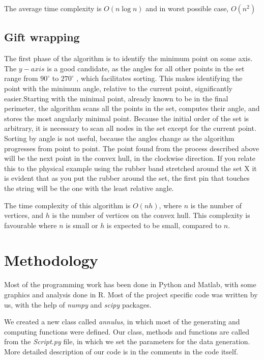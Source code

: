 \documentclass[12pt,a4paper]{article}
\begin{document}
The average time complexity is $O(n\log{n})$ and in worst possible case, $O(n^2)$

\subsection{Gift wrapping}

The first phase of the algorithm is to identify the minimum point on some axis. The $ y-axis $ is a good candidate, as the angles for all other points in the set range from $90^{\circ}$  to $270^ {\circ}$ , which facilitates sorting. This makes identifying the point with the minimum angle, relative to the current point, significantly easier.Starting with the minimal point, already known to be in the final perimeter, the algorithm scans all the points in the set, computes their angle, and stores the most angularly minimal point. Because the initial order of the set is arbitrary, it is necessary to scan all nodes in the set except for the current point. Sorting by angle is not useful, because the angles change as the algorithm progresses from point to point. The point found from the process described above will be the next point in the convex hull, in the clockwise direction. If you relate this to the physical example using the rubber band stretched around the set X it is evident that as you put the rubber around the set, the first pin that touches the string will be the one with the least relative angle.\medskip

The time complexity of this algorithm is $O(nh)$, where $n$ is the number of vertices, and $h$ is the number of vertices on the convex hull. This complexity is favourable where $n$ is small or $h$ is expected to be small, compared to $n$. \medskip

\section{Methodology}
Most of the programming work has been done in Python and Matlab, with some graphics and analysis done in R. Most of the project specific code was written by us, with the help of \textit{numpy} and \textit{scipy} packages.
\medskip

We created a new class called \textit{annulus}, in which most of the generating and computing functions were defined. Our class, methods and functions are called from the \textit{Script.py} file, in which we set the parameters for the data generation. More detailed description of our code is in the comments in the code itself. \medskip
\end{document}

